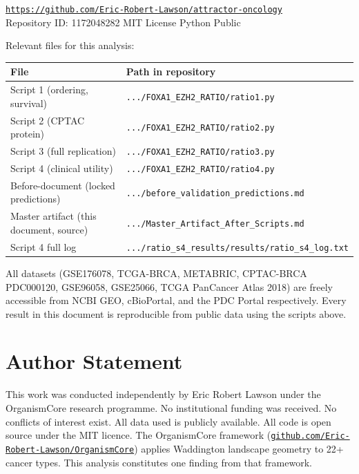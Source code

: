 \documentclass[12pt, a4paper]{article}
\begin{document}
\begin{center}
\href{https://github.com/Eric-Robert-Lawson/attractor-oncology}
{\texttt{https://github.com/Eric-Robert-Lawson/attractor-oncology}}\\[0.3em]
\small Repository ID: 1172048282 \textbar{} MIT License
\textbar{} Python \textbar{} Public
\end{center}

\noindent Relevant files for this analysis:

\begin{center}
\begin{tabular}{ll}
\toprule
\textbf{File} & \textbf{Path in repository} \\
\midrule
Script 1 (ordering, survival)
  & \texttt{.../FOXA1\_EZH2\_RATIO/ratio1.py} \\
Script 2 (CPTAC protein)
  & \texttt{.../FOXA1\_EZH2\_RATIO/ratio2.py} \\
Script 3 (full replication)
  & \texttt{.../FOXA1\_EZH2\_RATIO/ratio3.py} \\
Script 4 (clinical utility)
  & \texttt{.../FOXA1\_EZH2\_RATIO/ratio4.py} \\
Before-document (locked predictions)
  & \texttt{.../before\_validation\_predictions.md} \\
Master artifact (this document, source)
  & \texttt{.../Master\_Artifact\_After\_Scripts.md} \\
Script 4 full log
  & \texttt{.../ratio\_s4\_results/results/ratio\_s4\_log.txt} \\
\bottomrule
\end{tabular}
\end{center}

\noindent All datasets (GSE176078, TCGA-BRCA, METABRIC,
CPTAC-BRCA PDC000120, GSE96058, GSE25066, TCGA PanCancer
Atlas 2018) are freely accessible from NCBI GEO, cBioPortal,
and the PDC Portal respectively. Every result in this
document is reproducible from public data using the scripts
above.

\section*{Author Statement}

This work was conducted independently by Eric Robert Lawson
under the OrganismCore research programme. No institutional
funding was received. No conflicts of interest exist. All
data used is publicly available. All code is open source
under the MIT licence. The OrganismCore framework
(\href{https://github.com/Eric-Robert-Lawson/OrganismCore}
{\texttt{github.com/Eric-Robert-Lawson/OrganismCore}})
applies Waddington landscape geometry to 22+ cancer types.
This analysis constitutes one finding from that framework.
\end{document}

